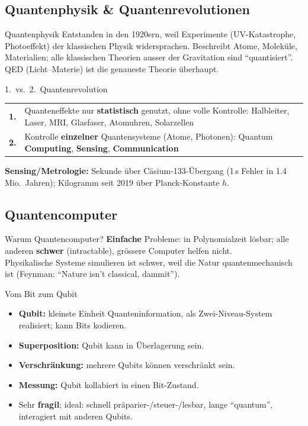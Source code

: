 \documentclass[a4paper, fontsize=7pt]{scrartcl}
\renewcommand*{\arraystretch}{1.5}  %
\begin{document}
\subsection{Quantenphysik \& Quantenrevolutionen}

\begin{mainbox}{Quantenphysik}
Entstanden in den 1920ern, weil Experimente (UV-Katastrophe, Photoeffekt) der
klassischen Physik widersprachen. Beschreibt Atome, Moleküle, Materialien; alle
klassischen Theorien ausser der Gravitation sind ``quantisiert''. QED
(Licht--Materie) ist die genaueste Theorie überhaupt.
\end{mainbox}

\begin{mainbox}{1.\ vs.\ 2.\ Quantenrevolution}
\renewcommand*{\arraystretch}{1.15}
\setlength{\tabcolsep}{3pt}
\begin{tabularx}{\linewidth}{@{}l|>{\raggedright\arraybackslash}X@{}}
\textbf{1.} & Quanteneffekte nur \textbf{statistisch} genutzt, ohne volle
  Kontrolle: Halbleiter, Laser, MRI, Glasfaser, Atomuhren, Solarzellen \\
\textbf{2.} & Kontrolle \textbf{einzelner} Quantensysteme (Atome, Photonen):
  Quantum \textbf{Computing}, \textbf{Sensing}, \textbf{Communication} \\
\end{tabularx}
\textbf{Sensing/Metrologie:} Sekunde über Cäsium-133-Übergang (1\,s Fehler in
1.4 Mio.\ Jahren); Kilogramm seit 2019 über Planck-Konstante $h$.
\end{mainbox}

\subsection{Quantencomputer}

\begin{mainbox}{Warum Quantencomputer?}
\textbf{Einfache} Probleme: in Polynomialzeit lösbar; alle anderen \textbf{schwer}
(intractable), grössere Computer helfen nicht.\\
Physikalische Systeme simulieren ist schwer, weil die Natur quantenmechanisch ist
(Feynman: ``Nature isn't classical, dammit'').
\end{mainbox}

\begin{mainbox}{Vom Bit zum Qubit}
\begin{itemize}
    \item \textbf{Qubit:} kleinste Einheit Quanteninformation, als
          Zwei-Niveau-System realisiert; kann Bits kodieren.
    \item \textbf{Superposition:} Qubit kann in Überlagerung sein.
    \item \textbf{Verschränkung:} mehrere Qubits können verschränkt sein.
    \item \textbf{Messung:} Qubit kollabiert in einen Bit-Zustand.
    \item Sehr \textbf{fragil}; ideal: schnell präparier-/steuer-/lesbar, lange
          ``quantum'', interagiert mit anderen Qubits.
\end{itemize}
\end{mainbox}
\end{document}
